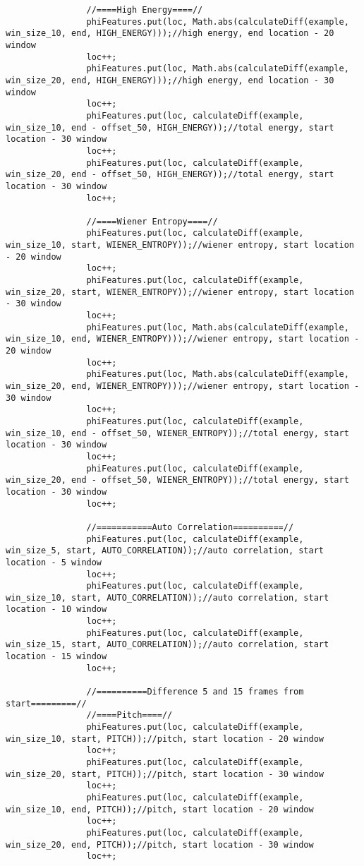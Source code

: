 \documentclass[11pt, oneside]{article}   	%
\begin{document}
\begin{lstlisting}
                //====High Energy====//
                phiFeatures.put(loc, Math.abs(calculateDiff(example, win_size_10, end, HIGH_ENERGY)));//high energy, end location - 20 window
                loc++;
                phiFeatures.put(loc, Math.abs(calculateDiff(example, win_size_20, end, HIGH_ENERGY)));//high energy, end location - 30 window
                loc++;
                phiFeatures.put(loc, calculateDiff(example, win_size_10, end - offset_50, HIGH_ENERGY));//total energy, start location - 30 window
                loc++;
                phiFeatures.put(loc, calculateDiff(example, win_size_20, end - offset_50, HIGH_ENERGY));//total energy, start location - 30 window
                loc++;

                //====Wiener Entropy====//
                phiFeatures.put(loc, calculateDiff(example, win_size_10, start, WIENER_ENTROPY));//wiener entropy, start location - 20 window
                loc++;
                phiFeatures.put(loc, calculateDiff(example, win_size_20, start, WIENER_ENTROPY));//wiener entropy, start location - 30 window
                loc++;
                phiFeatures.put(loc, Math.abs(calculateDiff(example, win_size_10, end, WIENER_ENTROPY)));//wiener entropy, start location - 20 window
                loc++;
                phiFeatures.put(loc, Math.abs(calculateDiff(example, win_size_20, end, WIENER_ENTROPY)));//wiener entropy, start location - 30 window
                loc++;
                phiFeatures.put(loc, calculateDiff(example, win_size_10, end - offset_50, WIENER_ENTROPY));//total energy, start location - 30 window
                loc++;
                phiFeatures.put(loc, calculateDiff(example, win_size_20, end - offset_50, WIENER_ENTROPY));//total energy, start location - 30 window
                loc++;

                //===========Auto Correlation==========//
                phiFeatures.put(loc, calculateDiff(example, win_size_5, start, AUTO_CORRELATION));//auto correlation, start location - 5 window
                loc++;
                phiFeatures.put(loc, calculateDiff(example, win_size_10, start, AUTO_CORRELATION));//auto correlation, start location - 10 window
                loc++;
                phiFeatures.put(loc, calculateDiff(example, win_size_15, start, AUTO_CORRELATION));//auto correlation, start location - 15 window
                loc++;

                //==========Difference 5 and 15 frames from start=========//
                //====Pitch====//
                phiFeatures.put(loc, calculateDiff(example, win_size_10, start, PITCH));//pitch, start location - 20 window
                loc++;
                phiFeatures.put(loc, calculateDiff(example, win_size_20, start, PITCH));//pitch, start location - 30 window
                loc++;
                phiFeatures.put(loc, calculateDiff(example, win_size_10, end, PITCH));//pitch, start location - 20 window
                loc++;
                phiFeatures.put(loc, calculateDiff(example, win_size_20, end, PITCH));//pitch, start location - 30 window
                loc++;


\end{lstlisting}
\end{document}
